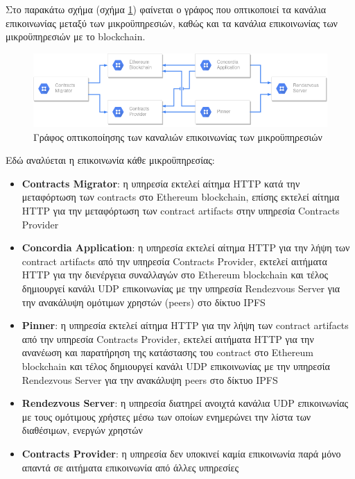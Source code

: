 Στο παρακάτω σχήμα (σχήμα \ref{figure:4-4-communications-graph}) φαίνεται ο γράφος που οπτικοποιεί τα κανάλια επικοινωνίας μεταξύ των μικροϋπηρεσιών, καθώς και τα κανάλια επικοινωνίας των μικροϋπηρεσιών με το blockchain.

\begin{figure}[H]
    \centering
    \includegraphics[width=.9\textwidth]{assets/figures/chapter-4/4.4.communications-diagram.png}
    \caption{Γράφος οπτικοποίησης των καναλιών επικοινωνίας των μικροϋπηρεσιών}
    \label{figure:4-4-communications-graph}
\end{figure}

Εδώ αναλύεται η επικοινωνία κάθε μικροϋπηρεσίας:

\begin{itemize}
    \item \textbf{Contracts Migrator}: η υπηρεσία εκτελεί αίτημα HTTP κατά την μεταφόρτωση των \textenglish{contracts} στο Ethereum blockchain, επίσης εκτελεί αίτημα HTTP για την μεταφόρτωση των contract artifacts στην υπηρεσία Contracts Provider

    \item \textbf{Concordia Application}: η υπηρεσία εκτελεί αίτημα HTTP για την λήψη των contract \textenglish{artifacts} από την υπηρεσία Contracts Provider, εκτελεί αιτήματα HTTP για την διενέργεια συναλλαγών στο Ethereum blockchain και τέλος δημιουργεί κανάλι UDP επικοινωνίας με την υπηρεσία Rendezvous Server για την ανακάλυψη ομότιμων χρηστών (peers) στο δίκτυο IPFS

    \item \textbf{Pinner}: η υπηρεσία εκτελεί αίτημα HTTP για την λήψη των contract artifacts από την υπηρεσία Contracts Provider, εκτελεί αιτήματα HTTP για την ανανέωση και παρατήρηση της κατάστασης του contract στο Ethereum blockchain και τέλος δημιουργεί κανάλι UDP επικοινωνίας με την υπηρεσία Rendezvous Server για την ανακάλυψη peers στο δίκτυο IPFS

    \item \textbf{Rendezvous Server}: η υπηρεσία διατηρεί ανοιχτά κανάλια UDP επικοινωνίας με τους ομότιμους χρήστες μέσω των οποίων ενημερώνει την λίστα των διαθέσιμων, ενεργών χρηστών

    \item \textbf{Contracts Provider}: η υπηρεσία δεν υποκινεί καμία επικοινωνία παρά μόνο απαντά σε αιτήματα επικοινωνία από άλλες υπηρεσίες
\end{itemize}

